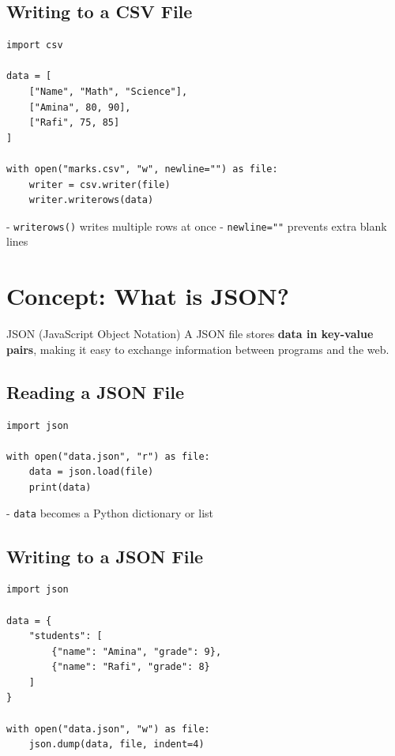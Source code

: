 \subsection{Writing to a CSV File}

\begin{verbatim}
import csv

data = [
    ["Name", "Math", "Science"],
    ["Amina", 80, 90],
    ["Rafi", 75, 85]
]

with open("marks.csv", "w", newline="") as file:
    writer = csv.writer(file)
    writer.writerows(data)
\end{verbatim}

- \texttt{writerows()} writes multiple rows at once  
- \texttt{newline=""} prevents extra blank lines  

\section{Concept: What is JSON?}

\begin{definition}{JSON (JavaScript Object Notation)}
A JSON file stores \textbf{data in key-value pairs}, making it easy to exchange information between programs and the web.
\end{definition}

\subsection{Reading a JSON File}

\begin{verbatim}
import json

with open("data.json", "r") as file:
    data = json.load(file)
    print(data)
\end{verbatim}

- \texttt{data} becomes a Python dictionary or list  

\subsection{Writing to a JSON File}

\begin{verbatim}
import json

data = {
    "students": [
        {"name": "Amina", "grade": 9},
        {"name": "Rafi", "grade": 8}
    ]
}

with open("data.json", "w") as file:
    json.dump(data, file, indent=4)
\end{verbatim}

